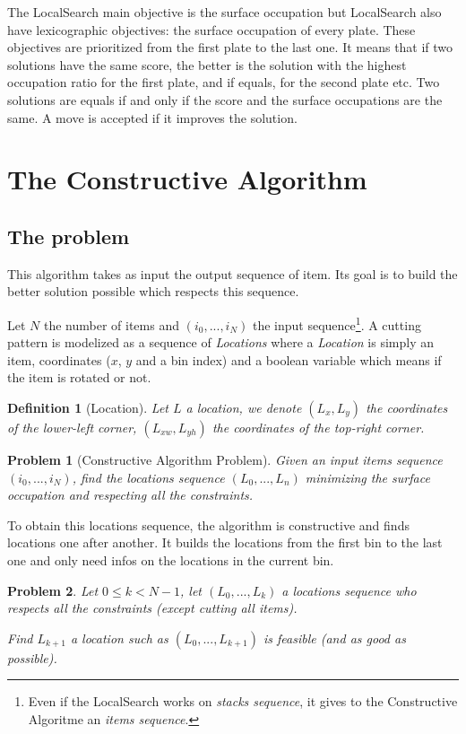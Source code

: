 \documentclass{article}
\newtheorem{problem}{Problem}
\newtheorem{definition}{Definition}
\begin{document}
The LocalSearch main objective is the surface occupation but LocalSearch also have lexicographic objectives: the surface occupation of every plate. These objectives are prioritized from the first plate to the last one.
It means that if two solutions have the same score, the better is the solution with the highest occupation ratio for the first plate, and if equals, for the second plate etc. Two solutions are equals if and only if the score and the surface occupations are the same. A move is accepted if it improves the solution.

\section{The Constructive Algorithm}

    \subsection{The problem}
This algorithm takes as input the output sequence of item. Its goal is to build the better solution possible which respects this sequence.

Let $N$ the number of items and $(i_0, ..., i_N)$ the input sequence\footnote{Even if the LocalSearch works on \textit{stacks sequence}, it gives to the Constructive Algoritme an \textit{items sequence}.}. 
A cutting pattern is modelized as a sequence of \textit{Locations} where a \textit{Location} is simply an item, coordinates ($x$, $y$ and a bin index) and a boolean variable which means if the item is rotated or not.

\begin{definition}[Location]
Let $L$ a location, we denote $(L_x, L_y)$ the coordinates of the lower-left corner, $(L_{xw}, L_{yh})$ the coordinates of the top-right corner.
\end{definition}

\begin{problem}[Constructive Algorithm Problem]
Given an input items sequence $(i_0, ..., i_N)$, find the locations sequence $(L_0, ..., L_n)$ minimizing the surface occupation and respecting all the constraints.
\end{problem}

To obtain this locations sequence, the algorithm is constructive and finds locations one after another. It builds the locations from the first bin to the last one and only need infos on the locations in the current bin.

\begin{problem}
Let $0 \leq k  < N - 1$, let $(L_0, ..., L_k)$ a locations sequence who respects all the constraints (except cutting all items).

Find $L_{k + 1}$ a location such as $(L_0, ..., L_{k + 1})$ is feasible (and as good as possible).
\end{problem}
\end{document}
